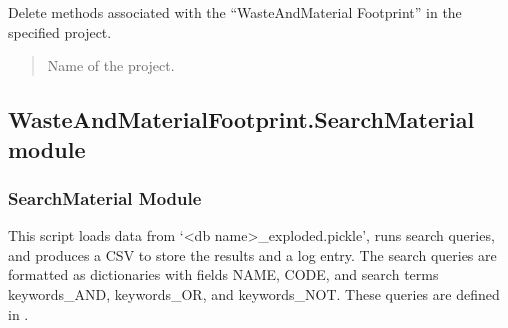 \documentclass[letterpaper,10pt,english]{sphinxmanual}
\begin{document}
\begin{fulllineitems}
\label{\detokenize{WMFootprint_api:WasteAndMaterialFootprint.MethodEditor.DeleteMethods}}
\pysigstartsignatures
{}
\pysigstopsignatures
\sphinxAtStartPar
Delete methods associated with the “WasteAndMaterial Footprint” in the specified project.
\begin{quote}\begin{description}
\sphinxAtStartPar
{} \textendash{} Name of the project.

\end{description}\end{quote}

\end{fulllineitems}



\subsection{WasteAndMaterialFootprint.SearchMaterial module}
\label{\detokenize{WMFootprint_api:module-WasteAndMaterialFootprint.SearchMaterial}}\label{\detokenize{WMFootprint_api:wasteandmaterialfootprint-searchmaterial-module}}

\subsubsection{SearchMaterial Module}
\label{\detokenize{WMFootprint_api:searchmaterial-module}}
\sphinxAtStartPar
This script loads data from ‘\textless{}db name\textgreater{}\_exploded.pickle’, runs search queries, 
and produces a CSV to store the results and a log entry. The search queries are 
formatted as dictionaries with fields NAME, CODE, and search terms keywords\_AND, 
keywords\_OR, and keywords\_NOT. These queries are defined in .
\end{document}
